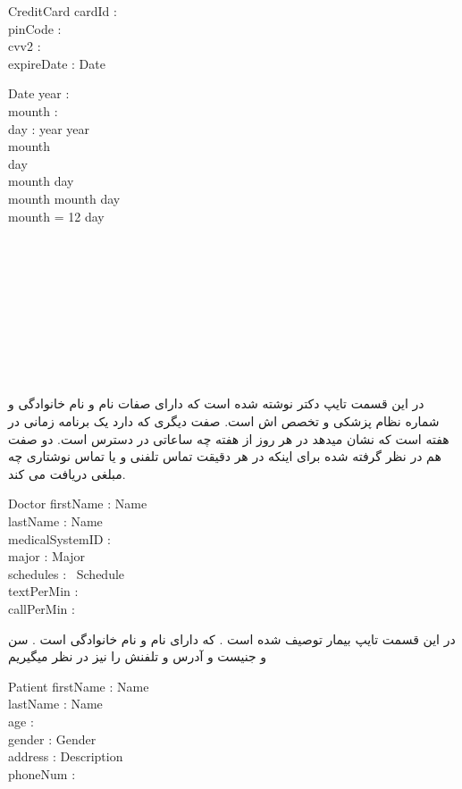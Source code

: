 \documentclass{article}
\begin{document}
\begin{schema}{CreditCard}
cardId : \nat\\
pinCode : \nat\\
cvv2 : \nat\\
expireDate : Date
\end{schema}

\begin{schema}{Date}
year : \nat\\
mounth : \nat\\
day : \nat
\where
year  \land year \\
mounth \\
day \\
mounth  \implies day \\
mounth  \land mounth  \implies day \\
mounth = 12 \implies  day 
\end{schema}
\\
\\
\\
\\
\\
\\
\\
\\
\\
در این قسمت تایپ دکتر نوشته شده است که دارای صفات نام و نام خانوادگی و شماره نظام پزشکی و تخصص اش است. صفت دیگری که دارد یک برنامه زمانی در هفته است که نشان میدهد در هر روز از هفته چه ساعاتی در دسترس است. دو صفت هم در نظر گرفته شده برای اینکه در هر دقیقت تماس تلفنی و یا تماس نوشتاری چه مبلغی دریافت می کند.

\begin{schema}{Doctor}
firstName : Name\\
lastName : Name\\
medicalSystemID : \nat\\
major : Major\\
schedules : \power~Schedule\\
textPerMin : \nat\\
callPerMin : \nat
\end{schema}

در این قسمت تایپ بیمار توصیف شده است . که دارای نام و نام خانوادگی است . سن و جنیست و آدرس و تلفنش را نیز در نظر میگیریم
\begin{schema}{Patient}
firstName : Name\\
lastName : Name\\
age : \nat\\
gender : Gender\\
address : Description\\
phoneNum : \nat
\end{schema}
\end{document}
